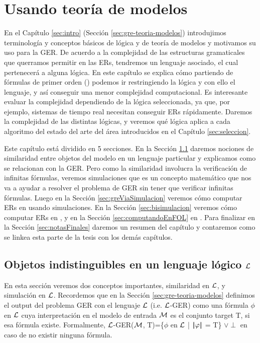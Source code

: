 \chapter{Usando teor\'ia de modelos}
\label{sec:intro_logica}

En el Cap\'itulo \ref{sec:intro} (Secci\'on \ref{sec:gre-teoria-modelos}) introdujimos terminolog\'ia y conceptos b\'asicos de l\'ogica y de teor\'ia de modelos y motivamos su uso para la GER.
De acuerdo a la complejidad de las estructuras gramaticales que querramos permitir en las ERs, tendremos un lenguaje asociado, 
el cual pertenecer\'a a alguna l\'ogica. En este cap\'itulo se explica c\'omo partiendo de f\'ormulas de primer orden (\FOL) 
podemos ir restringiendo la l\'ogica y con ello el lenguaje, y as\'i conseguir una menor complejidad computacional. Es interesante evaluar la complejidad dependiendo de la l\'ogica seleccionada, 
ya que, por ejemplo, sistemas de tiempo real necesitan conseguir ERs r\'apidamente. Daremos la complejidad de las distintas l\'ogicas, 
y veremos qu\'e l\'ogica aplica a cada algoritmo del estado del arte del \'area introducidos en el Cap\'itulo \ref{sec:seleccion}.

Este cap\'itulo est\'a dividido en 5 secciones. En la Secci\'on \ref{sec:seleccionandoLenguaje} daremos nociones de similaridad entre objetos del modelo en un lenguaje particular y explicamos como se relacionan con la GER. Pero como la similaridad involucra la verificaci\'on de infinitas f\'ormulas, veremos simulaciones que es un concepto matem\'atico que nos va a ayudar a resolver el problema de GER sin tener que verificar infinitas f\'ormulas. Luego en la Secci\'on \ref{sec:greViaSimulacion} veremos c\'omo computar ERs en \EL usando simulaciones. En la Secci\'on \ref{sec:bisimulacion} veremos c\'omo computar ERs en \ALC, y en la Secci\'on \ref{sec:computandoEnFOL} en \FOL. Para finalizar en la Secci\'on \ref{sec:notasFinales} daremos un resumen del cap\'itulo y contaremos como se linkea esta parte de la tesis con los dem\'as cap\'itulos.


\section{Objetos indistinguibles en un lenguaje l\'ogico $\mathcal{L}$}
\label{sec:seleccionandoLenguaje}

En esta secci\'on veremos dos conceptos importantes, similaridad en $\mathcal{L}$, y simulaci\'on en $\mathcal{L}$. Recordemos que en la Secci\'on \ref{sec:gre-teoria-modelos} definimos el output del problema GER con el lenguaje $\mathcal{L}$ (i.e. $\mathcal{L}$-GER) como una f\'ormula $\phi$ en $\mathcal{L}$ cuya interpretaci\'on en el modelo de entrada  $\mathcal{M}$ es el conjunto target T, si esa f\'ormula existe. Formalmente, $\mathcal{L}$-GER($\mathcal{M}$, T)=\{$\phi$ en $\mathcal{L}$ | $|\!|\varphi|\!|$ = T\} $\lor \perp$ en caso de no existir ninguna f\'ormula.

